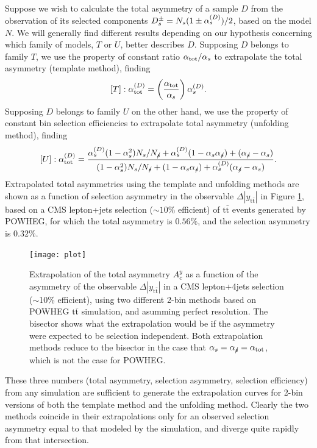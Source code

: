 \documentclass[letterpaper,11pt]{article}
\newcommand{\selected}{{\ensuremath s}}
\newcommand{\unselected}{{\ensuremath\slash\!\!\!\selected}}
\newcommand{\tot}{{\ensuremath\mathrm{tot}}}
\begin{document}
Suppose we wish to calculate the total asymmetry of a sample $D$ from
the observation of its selected components
$D_\selected^\pm=N_\selected(1\pm\alpha^{(D)}_\selected)/2$, based on
the model $N$.  We will generally find different results depending on
our hypothesis concerning which family of models, $T$ or $U$, better
describes $D$.  Supposing $D$ belongs to family $T$, we use the
property of constant ratio $\alpha_\tot/\alpha_\selected$ to
extrapolate the total asymmetry (template method), finding
\[[T]: \alpha_\tot^{(D)} = \left(\frac{\alpha_\tot}{\alpha_\selected}\right)\alpha^{(D)}_\selected.\]
Supposing $D$ belongs to family $U$ on the other hand, we use the
property of constant bin selection efficiencies to extrapolate total
asymmetry (unfolding method), finding
\[[U]: \alpha_\tot^{(D)} = \frac{\alpha^{(D)}_\selected(1-\alpha^2_\selected)N_\selected/N_\unselected + \alpha^{(D)}_\selected(1-\alpha_\selected\alpha_\unselected)+(\alpha_\unselected-\alpha_\selected)}{
                                                       (1-\alpha^2_\selected)N_\selected/N_\unselected + (1-\alpha_\selected\alpha_\unselected)+\alpha^{(D)}_\selected(\alpha_\unselected-\alpha_\selected)}{}.\]
%
Extrapolated total asymmetries using the template and unfolding
methods are shown as a function of selection asymmetry in the
observable $\Delta|y_{\mathrm{t\bar{t}}}|$ in Figure \ref{plot}, based
on a CMS lepton+jets selection ($\sim10\%$ efficient) of
$\mathrm{t\bar{t}}$ events generated by POWHEG, for which the total
asymmetry is $0.56\%$, and the selection asymmetry is $0.32\%$.
\begin{figure}
  \centering
  \texttt{[image: plot]}
  \caption{\label{plot} Extrapolation of the total asymmetry $A_c^y$
    as a function of the asymmetry of the observable
    $\Delta|y_{\mathrm{t\bar{t}}}|$ in a CMS lepton+4jets selection
    ($\sim$10\% efficient), using two different 2-bin methods based on
    {\sc POWHEG} $\mathrm{t\bar{t}}$ simulation, and asumming perfect
    resolution.  The bisector shows what the extrapolation would be if
    the asymmetry were expected to be selection independent.  Both
    extrapolation methods reduce to the bisector in the case that
    $\alpha_\selected=\alpha_\unselected=\alpha_\tot$, which is not
    the case for POWHEG.}
\end{figure}
These three numbers (total asymmetry, selection asymmetry, selection
efficiency) from any simulation are sufficient to generate the
extrapolation curves for 2-bin versions of both the template method
and the unfolding method.  Clearly the two methods coincide in their
extrapolations only for an observed selection asymmetry equal to that
modeled by the simulation, and diverge quite rapidly from that
intersection.
\end{document}
